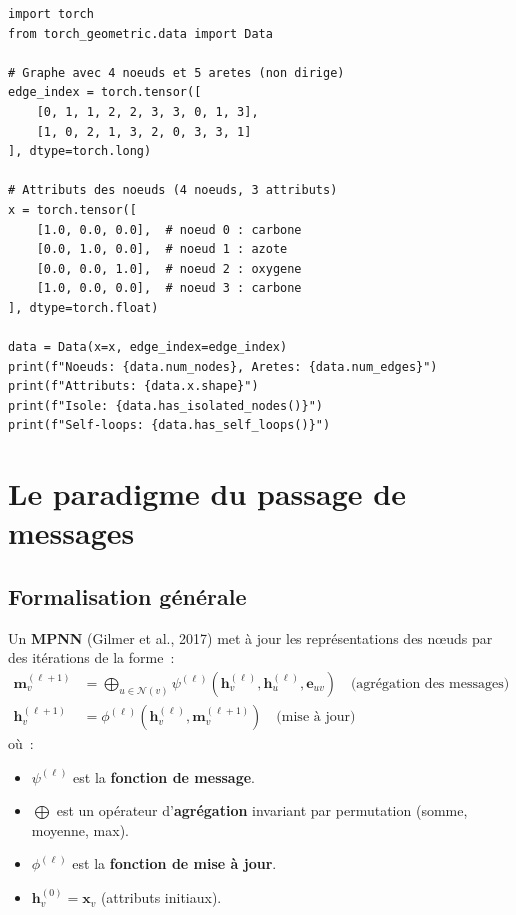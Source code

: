 \begin{codeblock}[title=\textbf{Repr\'esentation de graphes dans PyTorch Geometric}]
\begin{verbatim}
import torch
from torch_geometric.data import Data

# Graphe avec 4 noeuds et 5 aretes (non dirige)
edge_index = torch.tensor([
    [0, 1, 1, 2, 2, 3, 3, 0, 1, 3],
    [1, 0, 2, 1, 3, 2, 0, 3, 3, 1]
], dtype=torch.long)

# Attributs des noeuds (4 noeuds, 3 attributs)
x = torch.tensor([
    [1.0, 0.0, 0.0],  # noeud 0 : carbone
    [0.0, 1.0, 0.0],  # noeud 1 : azote
    [0.0, 0.0, 1.0],  # noeud 2 : oxygene
    [1.0, 0.0, 0.0],  # noeud 3 : carbone
], dtype=torch.float)

data = Data(x=x, edge_index=edge_index)
print(f"Noeuds: {data.num_nodes}, Aretes: {data.num_edges}")
print(f"Attributs: {data.x.shape}")
print(f"Isole: {data.has_isolated_nodes()}")
print(f"Self-loops: {data.has_self_loops()}")
\end{verbatim}
\end{codeblock}

\section{Le paradigme du passage de messages}

\subsection{Formalisation g\'en\'erale}

\begin{definition}
Un \textbf{MPNN} (Gilmer et al., 2017) met \`a jour les repr\'esentations des
n\oe uds par des it\'erations de la forme~:
\begin{align}
    \mathbf{m}_v^{(\ell+1)} &= \bigoplus_{u \in \mathcal{N}(v)}
    \psi^{(\ell)}\!\left(\mathbf{h}_v^{(\ell)}, \mathbf{h}_u^{(\ell)},
    \mathbf{e}_{uv}\right) \quad \text{(agr\'egation des messages)} \label{eq:mpnn_agg} \\
    \mathbf{h}_v^{(\ell+1)} &= \phi^{(\ell)}\!\left(\mathbf{h}_v^{(\ell)},
    \mathbf{m}_v^{(\ell+1)}\right) \quad \text{(mise \`a jour)} \label{eq:mpnn_upd}
\end{align}
o\`u~:
\begin{itemize}
    \item $\psi^{(\ell)}$ est la \textbf{fonction de message}.
    \item $\bigoplus$ est un op\'erateur d'\textbf{agr\'egation} invariant par
          permutation (somme, moyenne, max).
    \item $\phi^{(\ell)}$ est la \textbf{fonction de mise \`a jour}.
    \item $\mathbf{h}_v^{(0)} = \mathbf{x}_v$ (attributs initiaux).
\end{itemize}
\end{definition}


